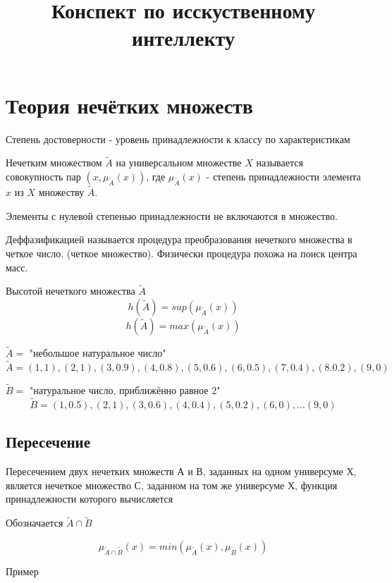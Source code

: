 
\usepackage[utf8]{inputenc}
\title{Конспект по исскуственному интеллекту}


    \maketitle
    \clearpage
    \tableofcontents    
    \clearpage
    
    \section{Теория нечётких множеств}
        Степень достоверности - уровень принадлежности к классу по характеристикам
		
		Нечетким множеством $\tilde A$ на универсальном множестве $X$ называется совокупность пар
		$(x, \mu_{\tilde A}(x))$, где $\mu_{\tilde A}(x)$
		- степень принадлежности элемента $x$ из
		$X$ множеству $\widetilde{A}$.
		
		
		Элементы с нулевой степенью принадлежности не включаются в множество.
		
		Деффазификацией называется процедура преобразования нечеткого множества в четкое число.
		(четкое множество). Физически процедура похожа на поиск центра масс. 
		
		Высотой нечеткого множества $\tilde A$ 
		\[h(\tilde A) = sup(\mu_{\tilde A}(x))\]
		\[h(\tilde A) = max(\mu_{\tilde A}(x))\]
		
		
    
        $\tilde A =$ "небольшое натуральное число"
		\[\tilde A = {(1, 1), (2, 1), (3, 0.9), (4, 0.8), (5, 0.6), (6, 0.5), (7, 0.4), (8. 0.2), (9, 0)}\]
		
		$\tilde B =$ "натуральное число, приближённо равное 2"
		\[\tilde B = {(1, 0.5), (2, 1), (3, 0.6), (4, 0.4), (5, 0.2), (6, 0), ... (9, 0)}\]
		
		\subsection{Пересечение}
    		Пересечением двух нечетких множеств А и В, заданных на одном универсуме Х, является 
			нечеткое множество С, заданном на том же универсуме Х, функция принадлежности которого
			вычисляется
			
			Обозначается $\tilde A \cap \tilde B$
			
			\[\mu_{\tilde A \cap \tilde B}(x) = min(\mu_{\tilde A}(x), \mu_{\tilde B}(x))\]
			
			Пример
			

